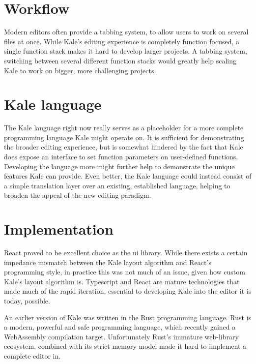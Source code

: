 \section{Workflow}
Modern editors often provide a tabbing system, to allow
users to work on several files at once. While Kale's editing experience
is completely function focused, a single function stack makes it hard
to develop larger projects. A tabbing system, switching between several
different function stacks would greatly help scaling Kale to work on bigger,
more challenging projects.

\section{Kale language}
The Kale language right now really serves as a placeholder for a more complete
programming language Kale might operate on.
It is sufficient for demonstrating the broader editing experience, but is somewhat
hindered by the fact that Kale does expose an interface to set function parameters
on user-defined functions. Developing the language more might further help to
demonstrate the unique features Kale can provide. Even better, the Kale language
could instead consist of a simple translation layer over an existing, established
language, helping to broaden the appeal of the new editing paradigm. 


\section{Implementation}
React proved to be excellent choice as the \ac{ui} library. While there exists a
certain impedance mismatch between the Kale layout algorithm and React's programming
style, in practice this was not much of an issue, given how custom Kale's layout
algorithm is. Typescript and React are mature technologies that made much of
the rapid iteration, essential to developing Kale into the editor it is today, possible.

An earlier version of Kale was written in the Rust programming language. Rust is a
modern, powerful and safe programming language, which recently gained a WebAssembly
compilation target. Unfortunately Rust's immature web-library ecosystem,
combined with its strict memory model made it hard to implement a complete editor in.

